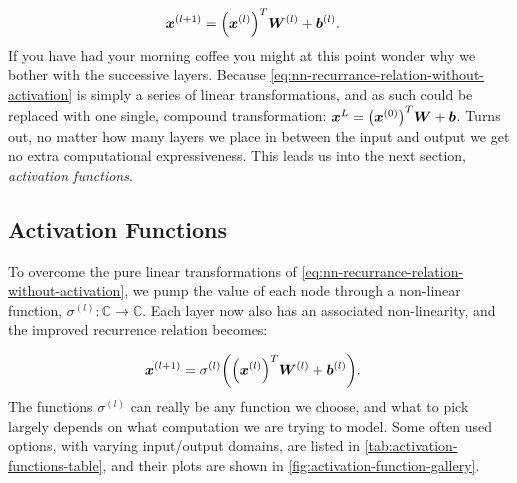\documentclass[Thesis.tex]{subfiles}
\begin{document}
\begin{align}
  \label{eq:nn-recurrance-relation-without-activation}
  \bm{x}^{(l+1)} &= \qty(\bm{x}^{(l)})^T\bm{W}^{(l)} + \bm{b}^{(l)}.
\end{align}
If you have had your morning coffee you might at this point wonder why we bother
with the successive layers. Because
\cref{eq:nn-recurrance-relation-without-activation} is simply a series of linear
transformations, and as such could be replaced with one single, compound
transformation: $\bm{x}^{L} = \qty(\bm{x}^{(0)})^T\bm{W} + \bm{b}$. Turns out, no
matter how many layers we place in between the input and output we get no extra
computational expressiveness. This leads us into the next section,
\emph{activation functions}.


\subsection{Activation Functions}

To overcome the pure linear transformations of
\cref{eq:nn-recurrance-relation-without-activation}, we pump the value of each
node through a non-linear function, $\sigma^{(l)}: \mathbb{C}\to\mathbb{C}$.
Each layer now also has an associated non-linearity, and the improved recurrence
relation becomes:

\begin{align}
  \label{eq:nn-recurrance-relation}
  \bm{x}^{(l+1)} &= \sigma^{(l)}\qty(\qty(\bm{x}^{(l)})^T\bm{W}^{(l)} + \bm{b}^{(l)}).
\end{align}
The functions $\sigma^{(l)}$ can really be any function we choose, and what to
pick largely depends on what computation we are trying to model. Some often used
options, with varying input/output domains, are listed in
\cref{tab:activation-functions-table}, and their plots are shown in \cref{fig:activation-function-gallery}.
\end{document}
